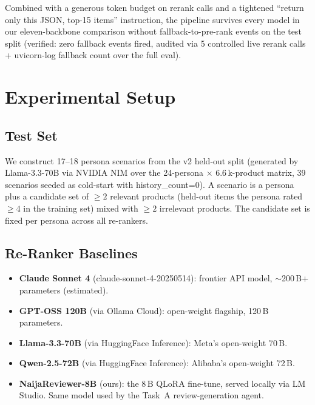 \documentclass[sigconf,nonacm,balance]{acmart}
\begin{document}
Combined with a generous token budget on rerank calls and a tightened
``return only this JSON, top-15 items'' instruction, the pipeline survives
every model in our eleven-backbone comparison without fallback-to-pre-rank
events on the test split (verified: zero fallback events fired, audited via
5 controlled
live rerank calls + uvicorn-log fallback count over the full eval).

\section{Experimental Setup}
\label{sec:experiments}

\subsection{Test Set}

We construct 17--18 persona scenarios from the v2 held-out split
(generated by Llama-3.3-70B via NVIDIA NIM over the 24-persona $\times$
6.6\,k-product matrix, 39 scenarios seeded as cold-start with
\textsf{history\_count}=0). A scenario is a persona plus a candidate set
of $\geq 2$ relevant products (held-out items the persona rated $\geq 4$
in the training set) mixed with $\geq 2$ irrelevant products. The
candidate set is fixed per persona across all re-rankers.

\subsection{Re-Ranker Baselines}

\begin{itemize}[leftmargin=*]
    \item \textbf{Claude Sonnet 4} (\textsf{claude-sonnet-4-20250514}):
          frontier API model, $\sim$200\,B+ parameters (estimated).
    \item \textbf{GPT-OSS 120B} (via Ollama Cloud): open-weight
          flagship, 120\,B parameters.
    \item \textbf{Llama-3.3-70B} (via HuggingFace Inference):
          Meta's open-weight 70\,B.
    \item \textbf{Qwen-2.5-72B} (via HuggingFace Inference):
          Alibaba's open-weight 72\,B.
    \item \textbf{NaijaReviewer-8B} (ours): the 8\,B QLoRA fine-tune,
          served locally via LM Studio. Same model used by the Task~A
          review-generation agent.
\end{itemize}
\end{document}
